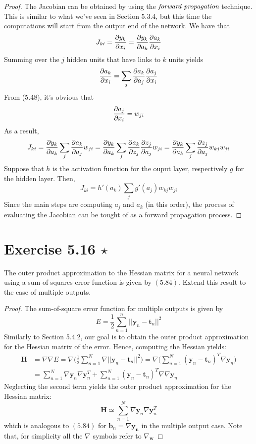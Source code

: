 \vspace{1em}

\begin{proof}
    The Jacobian can be obtained by using the $\emph{forward propagation}$ technique.
    This is similar to what we've seen in Section 5.3.4, but this time the computations
    will start from the output end of the network. We have that
    \[
        J_{ki} = \pdv{y_k}{x_i} = \pdv{y_k}{a_k} \pdv{a_k}{x_i}
    \] 
    Summing over the $j$ hidden units that have links to $k$ units yields
    \[
        \pdv{a_k}{x_i} = \sum_{j} \pdv{a_k}{a_j} \pdv{a_j}{x_i}
    \] 
    From (5.48), it's obvious that
    \[
        \pdv{a_j}{x_i} = w_{ji}
    \] 
    As a result,
    \[
        J_{ki} = \pdv{y_k}{a_k} \sum_{j} \pdv{a_k}{a_j} w_{ji}
        = \pdv{y_k}{a_k} \sum_{j} \pdv{a_k}{z_j} \pdv{z_j}{a_j} w_{ji}
        = \pdv{y_k}{a_k} \sum_{j} \pdv{z_j}{a_j} w_{kj} w_{ji}
    \] 
    Suppose that $h$ is the activation function for the ouput layer,
    respectively $g$ for the hidden layer. Then,
    \[
        J_{ki} = h'(a_k) \sum_{j} g'(a_j) w_{kj} w_{ji}
    \] 
    Since the main steps are computing $a_j$ and $a_k$ (in this order), the
    process of evaluating the Jacobian can be tought of as a 
    forward propagation process.
\end{proof}

\section*{Exercise 5.16 $\star$}
The outer product approximation to the Hessian matrix for
a neural network using a sum-of-squares error function is given
by  $(5.84)$. Extend this result to the case of 
multiple outputs.

\vspace{1em}

\begin{proof}
    The sum-of-square error function for multiple outputs is given by
    \[
        E = \frac{1}{2} \sum_{n=1}^n ||\mathbf{y}_n - \mathbf{t}_n||^2
    \] 
    Similarly to Section 5.4.2, our goal is to obtain the outer product
    approximation for the Hessian matrix of the error. Hence,
    computing the Hessian yields:
    \begin{align*}
        \mathbf{H} 
        &= \nabla \nabla E
        = \nabla\bigg(\frac{1}{2} \sum_{n=1}^{N} \nabla ||\mathbf{y}_n - \mathbf{t}_n||^2\bigg)
        = \nabla \bigg(\sum_{n=1}^{N} (\mathbf{y}_n - \mathbf{t}_n)^T \nabla \mathbf{y}_n\bigg) \\
        &= \sum_{n=1}^{N} \nabla \mathbf{y}_n \nabla \mathbf{y}_n^T
        + \sum_{n=1}^{N} (\mathbf{y}_n - \mathbf{t}_n)^T \nabla \nabla \mathbf{y}_n
    \end{align*}
    Neglecting the second term yields the outer product approximation
    for the Hessian matrix:
    \[
        \mathbf{H} \simeq \sum_{n=1}^{N} \nabla \mathbf{y}_n \nabla \mathbf{y}_n^T
    \] 
    which is analogous to $(5.84)$ for $\mathbf{b}_n = \nabla \mathbf{y_n}$
    in the multiple output case.
    Note that, for simplicity all the $\nabla$ symbols refer to $\nabla_\mathbf{w}$ 
\end{proof}

